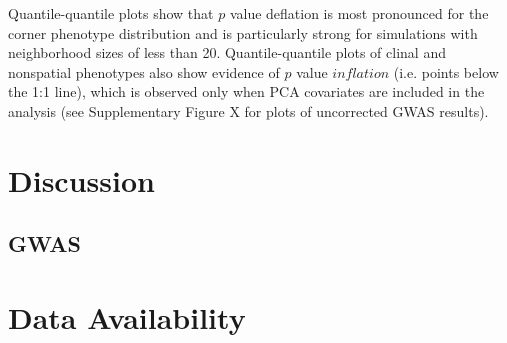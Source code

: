 \documentclass[9pt,twocolumn,twoside,lineno]{gsajnl}
\begin{document}
Quantile-quantile plots show that $p$ value deflation is most pronounced for the corner phenotype distribution and is particularly strong for simulations with neighborhood sizes of less than 20. Quantile-quantile plots of clinal and nonspatial phenotypes also show evidence of $p$ value $inflation$ (i.e. points below the 1:1 line), which is observed only when PCA covariates are included in the analysis (see Supplementary Figure X for plots of uncorrected GWAS results). 

\section{Discussion}

\subsection{GWAS}



\section{Data Availability}
\end{document}
